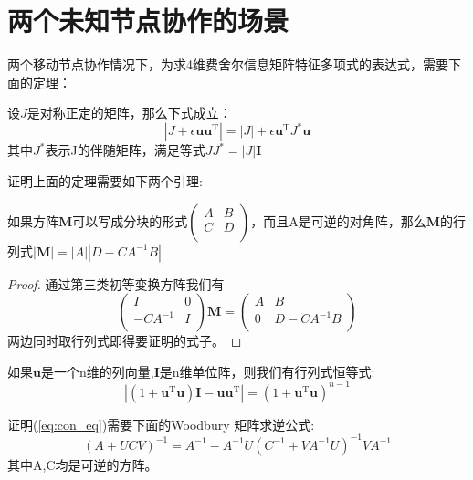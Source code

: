 \section{两个未知节点协作的场景}\label{section:two_node_cooperation}
两个移动节点协作情况下，为求4维费舍尔信息矩阵特征多项式的表达式，需要下面的定理：
\begin{theorem}\label{thm:ShenIden}
设$J$是对称正定的矩阵，那么下式成立：
\begin{equation}\label{eq:ShenIden}
|J+\epsilon \bm{u}\bm{u}^{\textrm{T}} |=|J|+\epsilon \bm{u}^{\textrm{T}} J^*\bm{u}
\end{equation}
其中$J^*$表示J的伴随矩阵，满足等式$JJ^*=|J|\bm{I}$
\end{theorem}
证明上面的定理需要如下两个引理:
\begin{lemma}\label{lemma:block}
如果方阵$\bm{M}$可以写成分块的形式$\left(\begin{array}{cc}
A&B\\
C&D\\
\end{array}\right)$，而且A是可逆的对角阵，那么$\bm{M}$的行列式$|\bm{M}|=|A||D-CA^{-1}B|$
\end{lemma}


\begin{proof}
通过第三类初等变换方阵我们有\[
\left(\begin{array}{cc}
I&0\\
-CA^{-1}&I\\
\end{array}\right) \bm{M}=\left(\begin{array}{cc}
A&B\\
0&D-CA^{-1}B\\
\end{array}\right)\]
两边同时取行列式即得要证明的式子。
\end{proof}
\begin{lemma}
如果$\bm{u}$是一个n维的列向量,$\bm{I}$是n维单位阵，则我们有行列式恒等式:
\begin{equation}\label{eq:con_eq}
|(1+\bm{u}^{\textrm{T}} \bm{u})\bm{I}-\bm{u}\bm{u}^{\textrm{T}} |=(1+\bm{u}^{\textrm{T}} \bm{u})^{n-1}
\end{equation}
\end{lemma}
证明(\ref{eq:con_eq})需要下面的Woodbury 矩阵求逆公式:
\begin{equation}\label{eq:woodbury}
(A+UCV)^{-1}=A^{-1}-A^{-1}U(C^{-1}+VA^{-1}U)^{-1}VA^{-1}
\end{equation}
其中A,C均是可逆的方阵。


